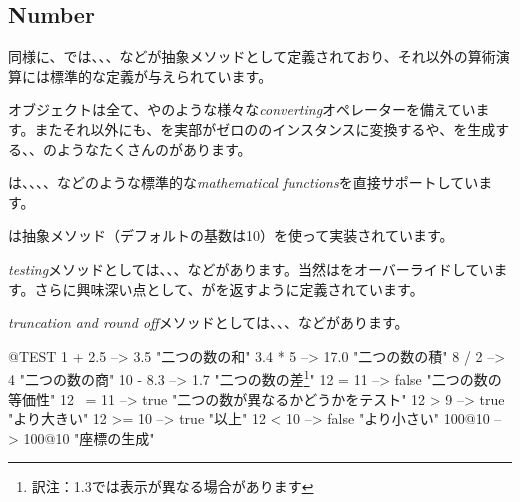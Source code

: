 \documentclass[a4paper,10pt,twoside]{book}
\begin{document}
\subsection{Number}

同様に、では、、、などが抽象メソッドとして定義されており、それ以外の算術演算には標準的な定義が与えられています。

オブジェクトは全て、やのような様々な\emph{converting}オペレーターを備えています。またそれ以外にも、を実部がゼロののインスタンスに変換するや、を生成する、、のようなたくさんのがあります。

は、、、、などのような標準的な\emph{mathematical functions}を直接サポートしています。

は抽象メソッド（デフォルトの基数は10）を使って実装されています。

\emph{testing}メソッドとしては、、、などがあります。当然はをオーバーライドしています。さらに興味深い点として、がを返すように定義されています。

\emph{truncation and round off}メソッドとしては、、、などがあります。

\begin{code}{@TEST}
1 + 2.5     --> 3.5             "二つの数の和"
3.4 * 5      --> 17.0           "二つの数の積"
8 / 2         --> 4                 "二つの数の商"
10 - 8.3   --> 1.7              "二つの数の差\footnote{訳注：\pharo 1.3では表示が異なる場合があります}"
12 = 11    --> false           "二つの数の等価性"
12 ~= 11 --> true            "二つの数が異なるかどうかをテスト"
12 > 9      --> true            "より大きい"
12 >= 10  --> true            "以上"
12 < 10    --> false           "より小さい"
100@10   --> 100@10    "座標の生成"
\end{code}
\end{document}
